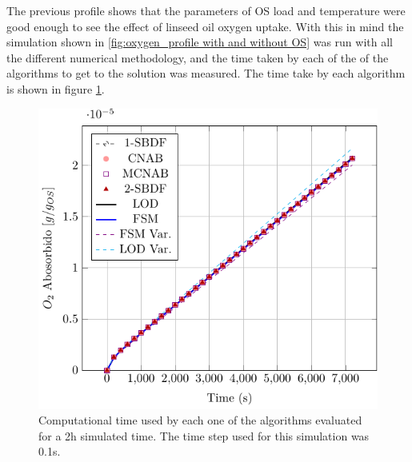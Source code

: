 The previous profile shows that the parameters of OS load and temperature were good enough to see the effect of linseed oil oxygen uptake. With this in mind the simulation shown in \ref{fig:oxygen_profile with and without OS} was run with all the different numerical methodology, and the time taken by each of the of the algorithms to get to the solution was measured. The time take by each algorithm is shown in figure \ref{fig:bar_graph_comp_times}.

\begin{figure}[ht]
    \centering
    \includegraphics[width=0.65\linewidth,page=3]{Documento_Latex/Imagenes/rozogafas.pdf}
    \caption{Computational time used by each one of the algorithms evaluated for a 2h simulated time. The time step used for this simulation was 0.1s.}
    \label{fig:bar_graph_comp_times}
\end{figure}

